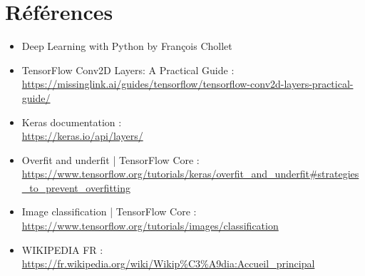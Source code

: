 \documentclass[12pt ,a4paper ]{article}
\begin{document}
\section{Références}
\begin{itemize}
\item Deep Learning with Python by François Chollet 
\item TensorFlow Conv2D Layers: A Practical Guide :\\ \url{https://missinglink.ai/guides/tensorflow/tensorflow-conv2d-layers-practical-guide/}%
\item Keras documentation :\\ \url{https://keras.io/api/layers/}%
\item Overfit and underfit  |  TensorFlow Core :\\ \url{https://www.tensorflow.org/tutorials/keras/overfit_and_underfit#strategies_to_prevent_overfitting}%
\item Image classification  |  TensorFlow Core :\\ \url{https://www.tensorflow.org/tutorials/images/classification}%
\item WIKIPEDIA FR :\\ \url{https://fr.wikipedia.org/wiki/Wikip%C3%A9dia:Accueil_principal}%
\end{itemize}
\end{document}
